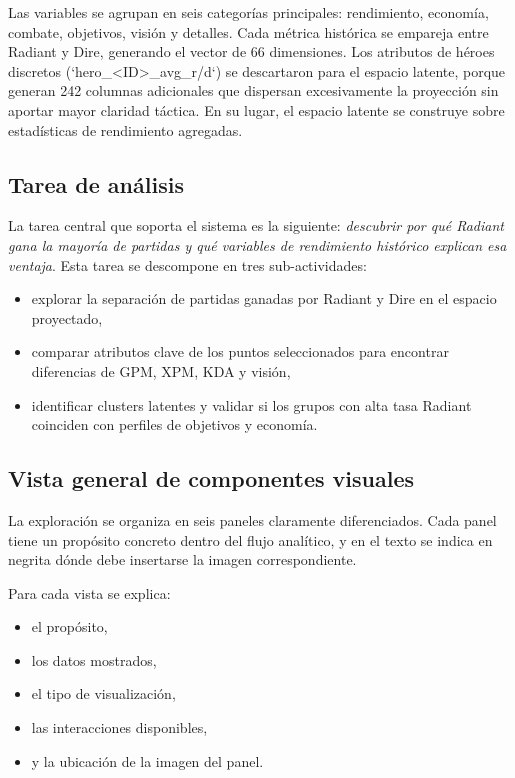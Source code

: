 \documentclass[conference]{IEEEtran}
\begin{document}
Las variables se agrupan en seis categorías principales: rendimiento, economía, combate, objetivos, visión y detalles. Cada métrica histórica se empareja entre Radiant y Dire, generando el vector de 66 dimensiones. Los atributos de héroes discretos (`hero\_<ID>\_avg\_r/d`) se descartaron para el espacio latente, porque generan 242 columnas adicionales que dispersan excesivamente la proyección sin aportar mayor claridad táctica. En su lugar, el espacio latente se construye sobre estadísticas de rendimiento agregadas.

\subsection{Tarea de análisis}

La tarea central que soporta el sistema es la siguiente: \textit{descubrir por qué Radiant gana la mayoría de partidas y qué variables de rendimiento histórico explican esa ventaja}. Esta tarea se descompone en tres sub-actividades:

\begin{itemize}
  \item explorar la separación de partidas ganadas por Radiant y Dire en el espacio proyectado,
  \item comparar atributos clave de los puntos seleccionados para encontrar diferencias de GPM, XPM, KDA y visión,
  \item identificar clusters latentes y validar si los grupos con alta tasa Radiant coinciden con perfiles de objetivos y economía.
\end{itemize}

\subsection{Vista general de componentes visuales}

La exploración se organiza en seis paneles claramente diferenciados. Cada panel tiene un propósito concreto dentro del flujo analítico, y en el texto se indica en negrita dónde debe insertarse la imagen correspondiente.

Para cada vista se explica:
\begin{itemize}
  \item el propósito,\
  \item los datos mostrados,\
  \item el tipo de visualización,\
  \item las interacciones disponibles,\
  \item y la ubicación de la imagen del panel.
\end{itemize}
\end{document}
